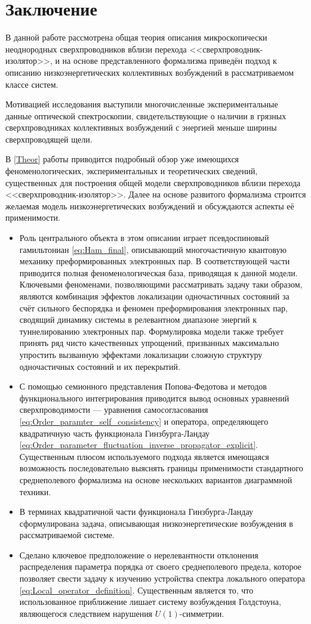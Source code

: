 \chapter{Заключение} \label{Concl}
В данной работе рассмотрена общая теория описания микроскопически неоднородных сверхпроводников вблизи перехода <<сверхпроводник-изолятор>>, и на основе представленного формализма приведён подход к описанию низкоэнергетических коллективных возбуждений в рассматриваемом классе систем.

Мотивацией исследования выступили многочисленные экспериментальные данные оптической спектроскопии, свидетельствующие о наличии в грязных сверхпроводниках коллективных возбуждений с энергией меньше ширины сверхпроводящей щели.

В \autoref{Theor} работы приводится подробный обзор уже имеющихся феноменологических, экспериментальных и теоретических сведений, существенных для построения общей модели сверхпроводников вблизи перехода <<сверхпроводник-изолятор>>. Далее на основе развитого формализма строится желаемая модель низкоэнергетических возбуждений и обсуждаются аспекты её применимости. 
\begin{itemize}
	\item Роль центрального объекта в этом описании играет псевдоспиновый гамильтониан \eqref{eq:Ham_final}, описывающий многочастичную квантовую механику преформированных электронных пар. В соответствующей части приводится полная феноменологическая база, приводящая к данной модели. Ключевыми феноменами, позволяющими рассматривать задачу таки образом, являются комбинация эффектов локализации одночастичных состояний за счёт сильного беспорядка и феномен преформирования электронных пар, сводящий динамику системы в релевантном диапазоне энергий к туннелированию электронных пар. Формулировка модели также требует принять ряд чисто качественных упрощений, призванных максимально упростить вызванную эффектами локализации сложную структуру одночастичных состояний и их перекрытий.
	\item С помощью семионного представления Попова-Федотова и методов функционального интегрирования приводится вывод основных уравнений сверхпроводимости --- уравнения самосогласования \eqref{eq:Order_paramter_self_consistency} и оператора, определяющего квадратичную часть функционала Гинзбурга-Ландау \eqref{eq:Order_parameter_fluctuation_inverse_propagator_explicit}. Существенным плюсом используемого подхода является имеющаяся возможность последовательно выяснять границы применимости стандартного среднеполевого формализма на основе нескольких вариантов диаграммной техники.
	\item В терминах квадратичной части функционала Гинзбурга-Ландау сформулирована задача, описывающая низкоэнергетические возбуждения в рассматриваемой системе.
	\item Сделано ключевое предположение о нерелевантности отклонения распределения параметра порядка от своего среднеполевого предела, которое позволяет свести задачу к изучению устройства спектра локального оператора \eqref{eq:Local_operator_definition}. Существенным является то, что использованное приближение лишает систему возбуждения Голдстоуна, являющегося следствием нарушения $U(1)$-симметрии.
\end{itemize}

